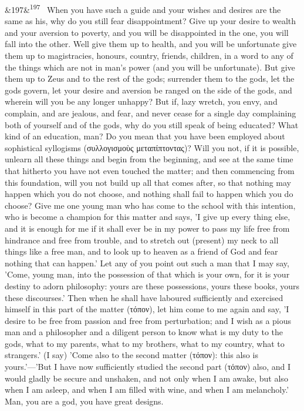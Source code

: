 \documentclass[12pt]{article}
\newcommand{\para}[1][]{\par\noindent\ifx&#1&\else\textsuperscript{\footnotesize #1}~\fi}
\begin{document}
\para[197] When you have such a guide and your wishes and desires are the same as his, why do you still fear disappointment? Give up your desire to wealth and your aversion to poverty, and you will be disappointed in the one, you will fall into the other. Well give them up to health, and you will be unfortunate give them up to magistracies, honours, country, friends, children, in a word to any of the things which are not in man's power (and you will be unfortunate). But give them up to Zeus and to the rest of the gods; surrender them to the gods, let the gods govern, let your desire and aversion be ranged on the side of the gods, and wherein will you be any longer unhappy? But if, lazy wretch, you envy, and complain, and are jealous, and fear, and never cease for a single day complaining both of yourself and of the gods, why do you still speak of being educated? What kind of an education, man? Do you mean that you have been employed about sophistical syllogisms (συλλογισμοὺς μεταπίπτοντας)? Will you not, if it is possible, unlearn all these things and begin from the beginning, and see at the same time that hitherto you have not even touched the matter; and then commencing from this foundation, will you not build up all that comes after, so that nothing may happen which you do not choose, and nothing shall fail to happen which you do choose? Give me one young man who has come to the school with this intention, who is become a champion for this matter and says, 'I give up every thing else, and it is enough for me if it shall ever be in my power to pass my life free from hindrance and free from trouble, and to stretch out (present) my neck to all things like a free man, and to look up to heaven as a friend of God and fear nothing that can happen.' Let any of you point out such a man that I may say, 'Come, young man, into the possession of that which is your own, for it is your destiny to adorn philosophy: yours are these possessions, yours these books, yours these discourses.' Then when he shall have laboured sufficiently and exercised himself in this part of the matter (τόπον), let him come to me again and say, 'I desire to be free from passion and free from perturbation; and I wish as a pious man and a philosopher and a diligent person to know what is my duty to the gods, what to my parents, what to my brothers, what to my country, what to strangers.' (I say) 'Come also to the second matter (τόπον): this also is yours.'—'But I have now sufficiently studied the second part (τόπον) also, and I would gladly be secure and unshaken, and not only when I am awake, but also when I am asleep, and when I am filled with wine, and when I am melancholy.' Man, you are a god, you have great designs.
\end{document}
